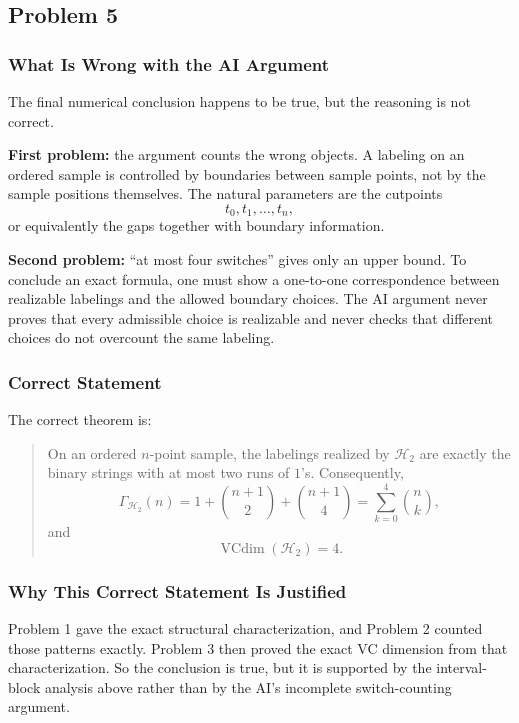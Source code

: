 \documentclass{article}
\begin{document}
\subsection{Problem 5}

\subsubsection{What Is Wrong with the AI Argument}

The final numerical conclusion happens to be true, but the reasoning is not correct.

\textbf{First problem:} the argument counts the wrong objects. A labeling on an ordered sample is controlled by boundaries between sample points, not by the sample positions themselves. The natural parameters are the cutpoints
$$
t_0,t_1,\dots,t_n,
$$
or equivalently the gaps together with boundary information.

\textbf{Second problem:} ``at most four switches'' gives only an upper bound. To conclude an exact formula, one must show a one-to-one correspondence between realizable labelings and the allowed boundary choices. The AI argument never proves that every admissible choice is realizable and never checks that different choices do not overcount the same labeling.

\subsubsection{Correct Statement}

The correct theorem is:

\begin{quote}
On an ordered $n$-point sample, the labelings realized by $\mathcal{H}_2$ are exactly the binary strings with at most two runs of $1$'s. Consequently,
$$
\Gamma_{\mathcal{H}_2}(n)
=
1 + \binom{n+1}{2} + \binom{n+1}{4}
=
\sum_{k=0}^4 \binom{n}{k},
$$
and
$$
\operatorname{VCdim}(\mathcal{H}_2) = 4.
$$
\end{quote}

\subsubsection{Why This Correct Statement Is Justified}

Problem 1 gave the exact structural characterization, and Problem 2 counted those patterns exactly. Problem 3 then proved the exact VC dimension from that characterization. So the conclusion is true, but it is supported by the interval-block analysis above rather than by the AI's incomplete switch-counting argument.
\end{document}
